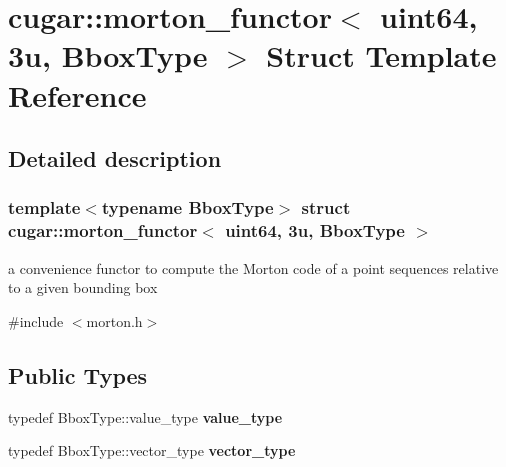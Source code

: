 \hypertarget{structcugar_1_1morton__functor_3_01uint64_00_013u_00_01_bbox_type_01_4}{}\section{cugar\+:\+:morton\+\_\+functor$<$ uint64, 3u, Bbox\+Type $>$ Struct Template Reference}
\label{structcugar_1_1morton__functor_3_01uint64_00_013u_00_01_bbox_type_01_4}


\subsection{Detailed description}
\subsubsection*{template$<$typename Bbox\+Type$>$\newline
struct cugar\+::morton\+\_\+functor$<$ uint64, 3u, Bbox\+Type $>$}

a convenience functor to compute the Morton code of a point sequences relative to a given bounding box 

{\ttfamily \#include $<$morton.\+h$>$}

\subsection*{Public Types}
\begin{DoxyCompactItemize}
\item 
\mbox{\label{structcugar_1_1morton__functor_3_01uint64_00_013u_00_01_bbox_type_01_4_ad2361a68e171ed8804e776a7499cc088}} 
typedef Bbox\+Type\+::value\+\_\+type {\bfseries value\+\_\+type}
\item 
\mbox{\label{structcugar_1_1morton__functor_3_01uint64_00_013u_00_01_bbox_type_01_4_a827337b60fcdc1cc9498a57b7e028f8f}} 
typedef Bbox\+Type\+::vector\+\_\+type {\bfseries vector\+\_\+type}
\end{DoxyCompactItemize}
